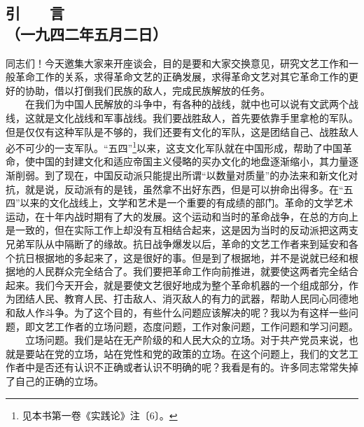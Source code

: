 \documentclass[cn,11pt,chinese]{elegantbook}
\def\myformat#1{\hfil\hfil #1}
\begin{document}
\subsection*{\myformat{引　　言}\\\myformat{（一九四二年五月二日）}}
同志们！今天邀集大家来开座谈会，目的是要和大家交换意见，研究文艺工作和一般革命工作的关系，求得革命文艺的正确发展，求得革命文艺对其它革命工作的更好的协助，借以打倒我们民族的敌人，完成民族解放的任务。\\
　　在我们为中国人民解放的斗争中，有各种的战线，就中也可以说有文武两个战线，这就是文化战线和军事战线。我们要战胜敌人，首先要依靠手里拿枪的军队。但是仅仅有这种军队是不够的，我们还要有文化的军队，这是团结自己、战胜敌人必不可少的一支军队。“五四”\footnote[1]{ 见本书第一卷《实践论》注〔6〕。}以来，这支文化军队就在中国形成，帮助了中国革命，使中国的封建文化和适应帝国主义侵略的买办文化的地盘逐渐缩小，其力量逐渐削弱。到了现在，中国反动派只能提出所谓“以数量对质量”的办法来和新文化对抗，就是说，反动派有的是钱，虽然拿不出好东西，但是可以拚命出得多。在“五四”以来的文化战线上，文学和艺术是一个重要的有成绩的部门。革命的文学艺术运动，在十年内战时期有了大的发展。这个运动和当时的革命战争，在总的方向上是一致的，但在实际工作上却没有互相结合起来，这是因为当时的反动派把这两支兄弟军队从中隔断了的缘故。抗日战争爆发以后，革命的文艺工作者来到延安和各个抗日根据地的多起来了，这是很好的事。但是到了根据地，并不是说就已经和根据地的人民群众完全结合了。我们要把革命工作向前推进，就要使这两者完全结合起来。我们今天开会，就是要使文艺很好地成为整个革命机器的一个组成部分，作为团结人民、教育人民、打击敌人、消灭敌人的有力的武器，帮助人民同心同德地和敌人作斗争。为了这个目的，有些什么问题应该解决的呢？我以为有这样一些问题，即文艺工作者的立场问题，态度问题，工作对象问题，工作问题和学习问题。\\
　　立场问题。我们是站在无产阶级的和人民大众的立场。对于共产党员来说，也就是要站在党的立场，站在党性和党的政策的立场。在这个问题上，我们的文艺工作者中是否还有认识不正确或者认识不明确的呢？我看是有的。许多同志常常失掉了自己的正确的立场。\\
\end{document}
